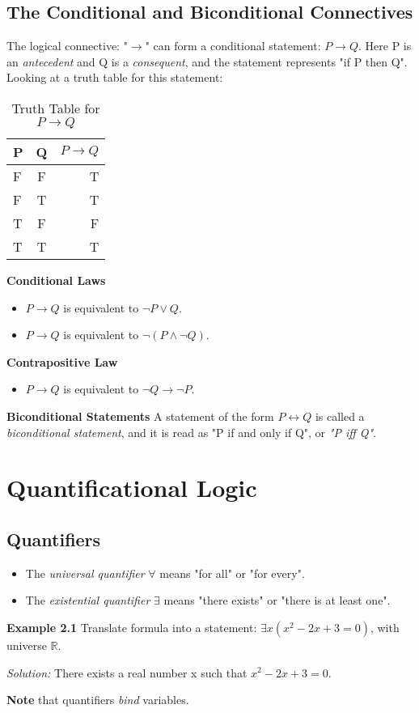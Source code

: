 \documentclass[11pt]{article}
\begin{document}
\subsection{The Conditional and Biconditional Connectives}
The logical connective: "$\rightarrow$" can form a conditional statement: $P \rightarrow Q$. \newline
Here P is an \textit{antecedent} and Q is a \textit{consequent}, and the statement represents "if P then Q". \\
Looking at a truth table for this statement:
\begin{table}[htbp]
    \caption{Truth Table for $P \rightarrow Q$}
    \centering
    \begin{tabular}{|l|c|r|}
        \hline
        P & Q & $P \rightarrow Q$ \\
        \hline
        F & F & T \\
        F & T & T \\
        T & F & F \\
        T & T & T \\
        \hline
    \end{tabular}
\end{table}
\newline
\textbf{Conditional Laws}
\begin{itemize}
    \item $P \rightarrow Q$ is equivalent to $\neg P \vee Q.$
    \item $P \rightarrow Q$ is equivalent to $\neg(P \wedge \neg Q).$
\end{itemize}
\textbf{Contrapositive Law}
\begin{itemize}
    \item $P \rightarrow Q$ is equivalent to $\neg Q \rightarrow \neg P.$
\end{itemize}
\textbf{Biconditional Statements}
A statement of the form $P \leftrightarrow Q$ is called a \textit{biconditional statement}, and it is read as "P if and only if Q", or \textit{"P iff Q"}. 
\section{Quantificational Logic}
\subsection{Quantifiers}
\begin{itemize} 
    \item The \textit{universal quantifier} $\forall$ means "for all" or "for every".
    \item The \textit{existential quantifier} $\exists$ means "there exists" or "there is at least one".
\end{itemize}
\textbf{Example 2.1} Translate formula into a statement: $\exists x(x^2 -2x +3 =0)$, with universe $\mathds{R}$.
\begin{center}
    \textit{Solution:} There exists a real number x such that $x^2 -2x +3 =0$.
\end{center} 
\noindent \textbf{Note} that quantifiers \textit{bind} variables.
\end{document}
